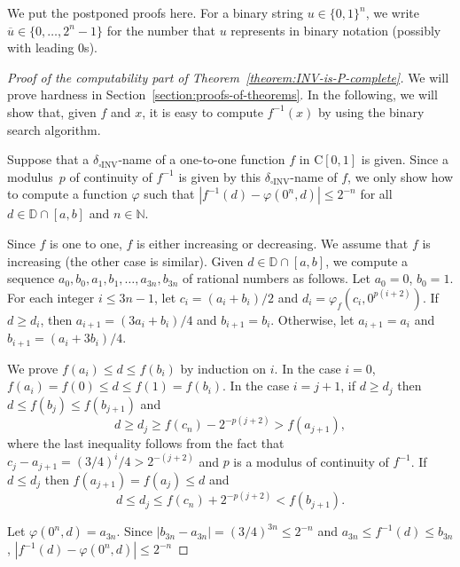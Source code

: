 \documentclass[conference]{IEEEtran}
\newcommand{\N}{\mathbb N}
\newcommand{\D}{\mathbb D}
\newcommand{\deltaboxINV}{\delta _{\square \mathrm{INV}}}
\newcommand{\classC}{\mathrm C}
\theoremstyle{definition}
\theoremstyle{remark}
\begin{document}
\clearpage

\appendix

We put the postponed proofs here. 
For a binary string $u \in \{0, 1\} ^n$, 
we write $\overline u \in \{0, \ldots, 2 ^n - 1\}$ for the 
number that $u$ represents in binary notation 
(possibly with leading 0s). 

\begin{proof}[Proof of the computability part of Theorem~\ref{theorem:INV-is-P-complete}]
We will prove hardness in Section~\ref{section:proofs-of-theorems}.
In the following, we will show that, 
given $f$ and $x$, 
it is easy to compute $f^{-1}(x)$ by using the binary search algorithm.

Suppose that a $\deltaboxINV$-name of a one-to-one function $f$ in $\classC [0, 1]$ is given. 
Since a modulus~$p$ of continuity of $f ^{-1}$ is given by this $\deltaboxINV$-name of $f$,
we only show how to compute a function $\varphi$ such that 
$|f^{-1}(d) - \varphi(0^n, d)| \le 2^{-n}$ for all $d \in \D \cap [a, b]$ and $n \in \N$.

Since $f$ is one to one, $f$ is either increasing or decreasing. 
We assume that $f$ is increasing (the other case is similar).
Given $d \in \D \cap [a, b]$, 
we compute a sequence  $a_0, b_0, a_1,b_1, \dots, a_{3n}, b_{3n}$ of rational numbers as follows.
Let $a_0 = 0$, $b_0 = 1$.
For each integer $i \le 3n-1$,
let $c_i = (a_i+b_i)/2$ and $d_i = \varphi_f(c_i, 0^{p(i+2)})$.
If $d \ge d_i$, then $a_{i+1} = (3a_i+b_i)/4$ and $b_{i+1} = b_i$. 
Otherwise, let $a_{i+1} = a_i$ and $b_{i+1} = (a_i+3b_i)/4$.

We prove $f(a_i) \leq d \leq f(b_i)$ by induction on $i$.
In the case $i = 0$, $f(a_i) = f(0) \le d \le f(1) = f(b_i)$.
In the case $i=j+1$, if $d \ge d_j$ then $d \le f(b_j) \le f(b_{j+1})$ and
\begin{equation}
 d \ge d_j \ge f(c_n) - 2^{-p(j+2)} > f(a_{j+1}),
\end{equation}
where the last inequality follows from the fact that $c_j - a_{j+1} = (3/4)^i/4 > 2^{-(j+2)}$ and $p$ is a modulus of continuity of $f^{-1}$.
If $d \le d_j$ then $f(a_{j+1}) = f(a_j) \le d$ and 
\begin{equation}
 d \le d_j \le f(c_n) + 2^{-p(j+2)} < f(b_{j+1}).
\end{equation}

Let $\varphi(0^n, d) = a_{3n}$.
Since $|b_{3n} - a_{3n}| = (3/4)^{3n} \le 2^{-n}$ and
$a_{3n} \le f^{-1}(d) \le b_{3n}$,
$|f^{-1}(d) - \varphi(0^n, d)| \le 2^{-n}$
\end{proof}
\end{document}
